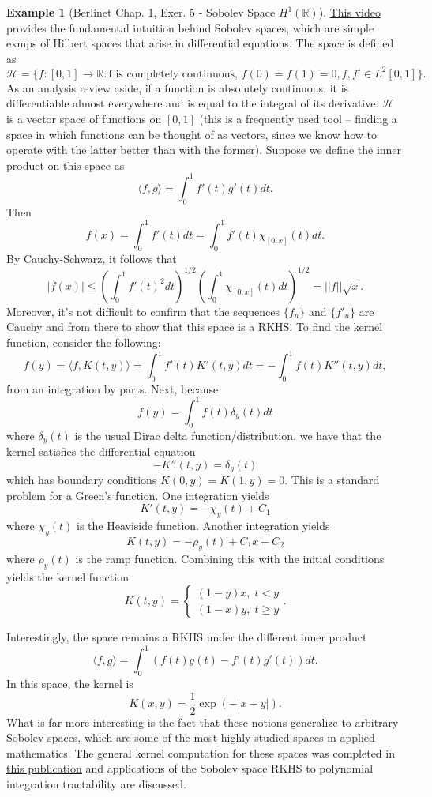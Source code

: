 \documentclass[psamsfonts]{amsart}
\theoremstyle{definition}
\newtheorem{exmp}[thm]{Example}
\theoremstyle{remark}
\numberwithin{equation}{section}
\begin{document}
\begin{exmp}[Berlinet Chap. 1, Exer. 5 - Sobolev Space $H^1(\mathbb{R})$]
\href{https://www.youtube.com/watch?v=MdGeC-JNaVY}{This video} provides the fundamental intuition behind Sobolev spaces, which are simple exmps of Hilbert spaces that arise in differential equations. The space is defined as 
$$\mathcal{H} = \{ f : [0, 1] \rightarrow \mathbb{R} : \text{f is completely continuous, } f(0) = f(1) = 0, f, f' \in L^2[0, 1] \}.$$
As an analysis review aside, if a function is absolutely continuous, it is differentiable almost everywhere and is equal to the integral of its derivative. $\mathcal{H}$ is a vector space of functions on $[0, 1]$ (this is a frequently used tool -- finding a space in which functions can be thought of as vectors, since we know how to operate with the latter better than with the former). Suppose we define the inner product on this space as 
$$\langle f, g \rangle = \int _0 ^1 f'(t) g'(t) dt.$$
Then 
$$f(x) = \int _0 ^1 f'(t) dt = \int _0 ^ 1 f'(t) \chi _{[0, x]} (t) dt. $$
By Cauchy-Schwarz, it follows that 
$$|f(x)| \leq \left( \int _0 ^1 f'(t)^2 dt \right) ^{1/2} \left( \int _0 ^1 \chi _{[0, x]} (t) dt \right) ^{1/2} = || f|| \sqrt{x}. $$
Moreover, it's not difficult to confirm that the sequences $\{ f_n \}$ and $\{ f' _n \}$ are Cauchy and from there to show that this space is a RKHS. To find the kernel function, consider the following: 
$$f(y) = \langle f, K(t , y) \rangle = \int _0 ^1 f'(t) K' (t, y) dt = - \int _0 ^1 f(t) K''(t , y) dt, $$
from an integration by parts. Next, because 
$$f(y) = \int _0 ^1 f(t) \delta _y (t) dt $$
where $\delta _y (t)$ is the usual Dirac delta function/distribution, we have that the kernel satisfies the differential equation 
$$- K''(t, y) = \delta _y (t)$$
which has boundary conditions $K(0, y) = K(1,y) = 0$. This is a standard problem for a Green's function. One integration yields 
$$K'(t , y) = - \chi _y (t) + C_1 $$
where $\chi _y (t)$ is the Heaviside function. Another integration yields 
$$K(t, y) = - \rho _y (t) + C_1 x + C_2 $$
where $\rho _y (t)$ is the ramp function. Combining this with the initial conditions yields the kernel function 
$$K(t, y) = \begin{cases} (1-y)x, \; t < y \\ (1-x)y, \; t \geq y \end{cases}. $$
\end{exmp}
Interestingly, the space remains a RKHS under the different inner product
$$\langle f, g \rangle = \int _0 ^1 (f(t) g(t) - f'(t) g'(t)) dt.$$
In this space, the kernel is 
$$K(x, y) = \frac{1}{2} \exp (- |x-y|). $$ What is far more interesting is the fact that these notions generalize to arbitrary Sobolev spaces, which are some of the most highly studied spaces in applied mathematics. The general kernel computation for these spaces was completed in \href{https://arxiv.org/pdf/1709.02568.pdf}{this publication} and applications of the Sobolev space RKHS to polynomial integration tractability are discussed. 
\end{document}
